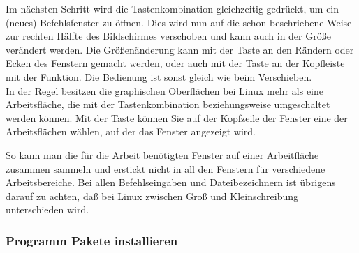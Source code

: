 Im nächsten Schritt wird die Tastenkombination  gleichzeitig gedrückt,
um ein (neues) Befehlsfenster zu öffnen.
Dies wird nun auf die schon beschriebene Weise zur rechten Hälfte des Bildschirmes verschoben und
kann auch in der Größe verändert werden.
Die Größenänderung kann mit der \LMB Taste an den Rändern oder Ecken des Fenstern gemacht werden,
oder auch mit der \RMB Taste an der Kopfleiste mit der  Funktion.
Die Bedienung ist sonst gleich wie beim Verschieben.\\

In der Regel besitzen die graphischen Oberflächen bei Linux mehr als eine Arbeitsfläche,
die mit der Tastenkombination 
beziehungsweise  umgeschaltet werden können.
Mit der \RMB Taste können Sie auf der Kopfzeile der Fenster eine
der Arbeitsflächen wählen, auf der das Fenster angezeigt wird.

So kann man die für die Arbeit benötigten Fenster auf einer Arbeitfläche
zusammen sammeln und erstickt nicht in all den Fenstern für verschiedene Arbeitsbereiche. 
Bei allen Befehlseingaben und Dateibezeichnern ist übrigens darauf zu  achten,
daß bei Linux zwischen Groß und Kleinschreibung unterschieden wird.


\subsubsection{Programm Pakete installieren}

